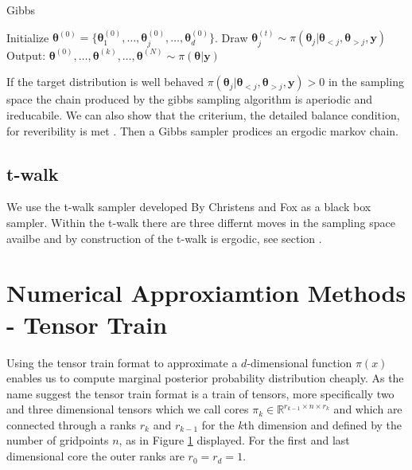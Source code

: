 \begin{algorithm}
	\caption{Gibbs}
	\begin{algorithmic}[1]
		\STATE Initialize \( \bm{\theta}^{(0)} = \{\bm{\theta}^{(0)}_{1}, \dots, \bm{\theta}^{(0)}_{j},\dots,\bm{\theta}^{(0)}_{d} \} \).
		\STATE Draw \(\bm{\theta}_j^{(t)} \sim  \pi(\bm{\theta}_j | \bm{\theta}_{<j}, \bm{\theta}_{>j} , \bm{y} )\) 
		\ENDFOR
		\ENDFOR
		\STATE Output: $ \bm{\theta}^{(0)}, \dots,  \bm{\theta}^{(k)} , \dots,   \bm{\theta}^{(N)} \sim \pi(\bm{\theta}| \bm{y}) $
	\end{algorithmic}
\end{algorithm}

If the target distribution is well behaved $\pi(\bm{\theta}_j | \bm{\theta}_{<j}, \bm{\theta}_{>j} , \bm{y} ) > 0$ in the sampling space the chain produced by the gibbs sampling algorithm is aperiodic and ireducabile.
We can also show that the criterium, the detailed balance condition, for reveribility is met \cite{}.
Then a Gibbs sampler prodices an ergodic markov chain.


\subsection{t-walk}
We use the t-walk sampler developed By Christens and Fox as a black box sampler\cite{}.
Within the t-walk there are three differnt moves in the sampling space availbe and by construction of the t-walk is ergodic, see section \cite{}.




\section{Numerical Approxiamtion Methods - Tensor Train}
Using the tensor train format to approximate a $d$-dimensional function $\pi(x)$ enables us to compute marginal posterior probability distribution cheaply.
As the name suggest the tensor train format is a train of tensors, more specifically two and three dimensional tensors which we call cores $\pi_{k} \in \mathbb{R}^{r_{k-1} \times n \times r_{k}}$  and which are connected through a ranks $r_{k}$ and $r_{k-1}$ for the $k$th dimension and defined by the number of gridpoints $n$, as in Figure \ref{} displayed.
For the first and last dimensional core the outer ranks are $r_0  = r_d = 1$.




